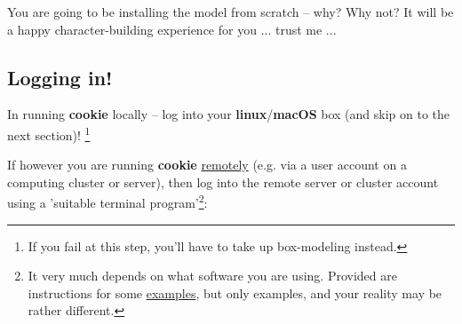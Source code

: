 You are going to be installing the model from scratch – why? Why not? It will be a happy character-building experience for you ... trust me ...


\subsection{Logging in!}

In running \textbf{cookie} locally -- log into your \textbf{linux}/\textbf{macOS} box (and skip on to the next section)! \footnote{If you fail at this step, you'll have to take up box-modeling instead.}

\noindent If however you are running \textbf{cookie} \uline{remotely} (e.g. via a user account on a computing cluster or server), then log into the remote server or cluster account using a 'suitable terminal program'\footnote{It very much depends on what software you are using. Provided are instructions for some \uline{examples}, but only examples, and your reality may be rather different.}:

